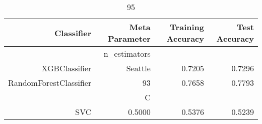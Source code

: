
\begin{table}[H]
    \caption{95}
    \centering
    \begin{tabular}{|r|r|r|r|}
        \hline
        Classifier &Meta Parameter &Training Accuracy
        &Test Accuracy\\
        \hline
        &n\_estimators &\multicolumn{2}{|r|}{}\\
        \hline
        XGBClassifier &Seattle &0.7205 &0.7296\\
        \hline
        RandomForestClassifier &93 &0.7658 &0.7793\\
        \hline
        &C &\multicolumn{2}{|r|}{}\\
        \hline
        SVC &0.5000 &0.5376 &0.5239\\
        \hline
    \end{tabular}
\end{table}
